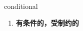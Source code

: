 
\begin{frame}
{\huge conditional}
\begin{center}
\begin{enumerate}\Large
  \item \textbf{有条件的，受制约的}
\end{enumerate}
\end{center}
\end{frame}
